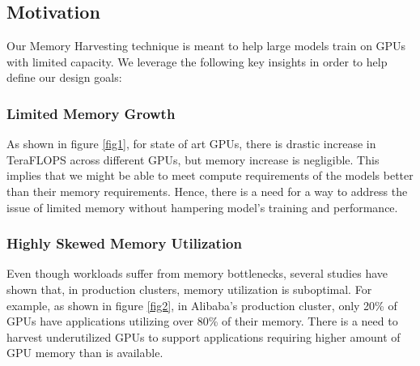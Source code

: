 \documentclass{article}
\begin{document}
\subsection{Motivation}
Our Memory Harvesting technique is meant to help large models train on GPUs with limited capacity.
We leverage the following key insights in order to help define our design goals:
	\subsubsection{Limited Memory Growth}As shown in figure \ref{fig1}, for state of 
	art GPUs, there is drastic increase in TeraFLOPS across different GPUs, but memory increase is negligible.
	This implies that we might be able to meet compute requirements of the models better than their memory requirements.
	Hence, there is a need for a way to address the issue of limited memory without hampering model's training and performance.

	\subsubsection{Highly Skewed Memory Utilization}
	Even though workloads suffer from memory bottlenecks, several studies have shown that, in production clusters, memory utilization
	is suboptimal. For example, as shown in figure \ref{fig2}, in Alibaba's production cluster, only 20\% of GPUs have applications
	utilizing over 80\% of their memory. There is a need to harvest underutilized GPUs to support applications requiring 
	higher amount of GPU memory than is available.
\end{document}
